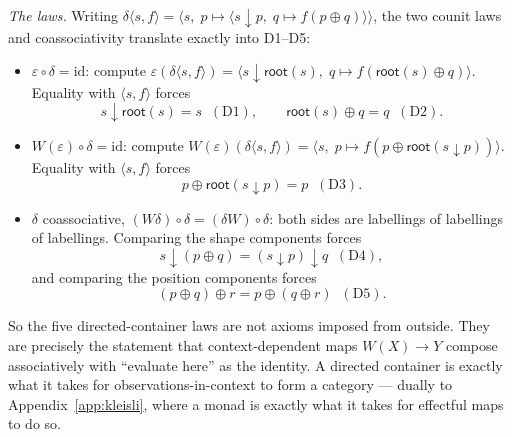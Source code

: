 \documentclass[11pt, a4paper]{article}
\theoremstyle{definition}
\theoremstyle{plain}
\newcommand{\droot}{\mathsf{root}}
\newcommand{\dsub}{\mathbin{\downarrow}}
\newcommand{\dshift}{\mathbin{\oplus}}
\begin{document}
\emph{The laws.}  Writing $\delta\langle s, f\rangle = \langle s,\;
p \mapsto \langle s \dsub p,\; q \mapsto f(p \dshift q)
\rangle\rangle$, the two counit laws and coassociativity translate
exactly into D1--D5:
\begin{itemize}
  \item $\varepsilon \circ \delta = \mathrm{id}$: compute
    $\varepsilon(\delta\langle s, f\rangle) =
    \langle s \dsub \droot(s),\; q \mapsto f(\droot(s) \dshift q)
    \rangle$.  Equality with $\langle s, f \rangle$ forces
    \[
      s \dsub \droot(s) = s \;\;(\mathrm{D1}),
      \qquad
      \droot(s) \dshift q = q \;\;(\mathrm{D2}).
    \]
  \item $W(\varepsilon) \circ \delta = \mathrm{id}$: compute
    $W(\varepsilon)(\delta\langle s, f\rangle) = \langle s,\;
    p \mapsto f(p \dshift \droot(s \dsub p))\rangle$.  Equality
    with $\langle s, f \rangle$ forces
    \[
      p \dshift \droot(s \dsub p) = p \;\;(\mathrm{D3}).
    \]
  \item $\delta$ coassociative, $(W\delta) \circ \delta =
    (\delta W) \circ \delta$: both sides are labellings of
    labellings of labellings.  Comparing the shape components forces
    \[
      s \dsub (p \dshift q) = (s \dsub p) \dsub q \;\;(\mathrm{D4}),
    \]
    and comparing the position components forces
    \[
      (p \dshift q) \dshift r = p \dshift (q \dshift r)
      \;\;(\mathrm{D5}).
    \]
\end{itemize}
So the five directed-container laws are not axioms imposed from
outside.  They are precisely the statement that context-dependent
maps $W(X) \to Y$ compose associatively with ``evaluate here'' as
the identity.  A directed container is exactly what it takes for
observations-in-context to form a category --- dually to
Appendix~\ref{app:kleisli}, where a monad is exactly what it takes
for effectful maps to do so.
\end{document}
